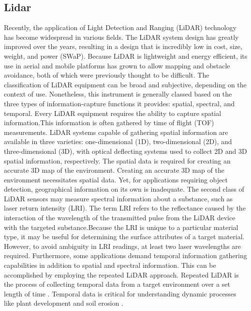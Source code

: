 \subsection{Lidar}
Recently, the application of Light Detection and Ranging (LiDAR) technology has become widespread in various fields. The LiDAR system design has greatly improved over the years, resulting in a design that is incredibly low in cost, size, weight, and power (SWaP). Because LiDAR is lightweight and energy efficient, its use in aerial and mobile platforms has grown to allow mapping and obstacle avoidance, both of which were previously thought to be difficult. The classification of LiDAR equipment can be broad and subjective, depending on the context of use. Nonetheless, this instrument is generally classed based on the three types of information-capture functions it provides: spatial, spectral, and temporal. Every LiDAR equipment requires the ability to capture spatial information.This information is often gathered by time of flight (TOF) measurements. LiDAR systems capable of gathering spatial information are available in three varieties: one-dimensional (1D), two-dimensional (2D), and three-dimensional (3D), with optical deflecting systems used to collect 2D and 3D spatial information, respectively. The spatial data is required for creating an accurate 3D map of the environment. Creating an accurate 3D map of the environment necessitates spatial data. Yet, for applications requiring object detection, geographical information on its own is inadequate. The second class of LiDAR sensors may measure spectral information about a substance, such as laser return intensity (LRI). The term LRI refers to the reflectance caused by the interaction of the wavelength of the transmitted pulse from the LiDAR device with the targeted substance.Because the LRI is unique to a particular material type, it may be useful for determining the surface attributes of a target material. However, to avoid ambiguity in LRI readings, at least two laser wavelengths are required. Furthermore, some applications demand temporal information gathering capabilities in addition to spatial and spectral information. This can be accomplished by employing the repeated LiDAR approach\cite{raj2020survey}. Repeated LiDAR is the process of collecting temporal data from a target environment over a set length of time \cite{robin2014making}. Temporal data is critical for understanding dynamic processes like plant development and soil erosion \cite{eitel2016beyond}.\\
